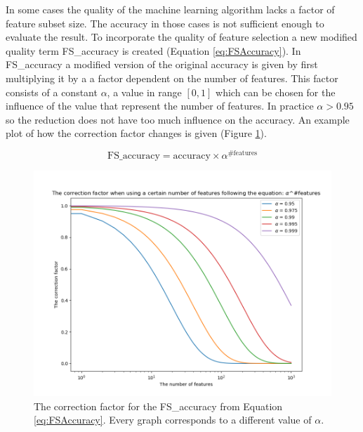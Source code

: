 \documentclass[10pt,a4paper]{article}
\begin{document}
	In some cases the quality of the machine learning algorithm lacks a factor of feature subset size. The accuracy in those cases is not sufficient enough to evaluate the result. To incorporate the quality of feature selection a new modified quality term FS\_accuracy is created (Equation \ref{eq:FSAccuracy}). In FS\_accuracy a modified version of the original accuracy is given by first multiplying it by a a factor dependent on the number of features. This factor consists of a constant $\alpha$, a value in range $[0, 1]$ which can be chosen for the influence of the  value that represent the number of features. In practice $\alpha > 0.95$ so the reduction does not have too much influence on the accuracy. An example plot of how the correction factor changes is given (Figure \ref{fig:FSAccuracyPlot}).
	
	\begin{equation*}
	\label{eq:FSAccuracy}
	\text{FS\_accuracy} = \text{accuracy} \times \alpha^{\text{\#features}}
	\end{equation*}
		
	\begin{figure}[H]
		\includegraphics[width=1\textwidth]{FS_accuracy_alpha.png}
		\caption{The correction factor for the FS\_accuracy from Equation \ref{eq:FSAccuracy}. Every graph corresponds to a different value of $\alpha$.}
		\label{fig:FSAccuracyPlot}
	\end{figure}
	
\end{document}
